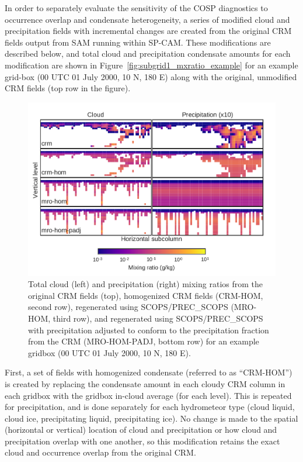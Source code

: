 In order to separately evaluate the sensitivity of the COSP diagnostics
to occurrence overlap and condensate heterogeneity, a series of modified
cloud and precipitation fields with incremental changes are created from
the original CRM fields output from SAM running within SP-CAM. These
modifications are described below, and total cloud and precipitation
condensate amounts for each modification are shown in
Figure~\ref{fig:subgrid1_mxratio_example} for an example grid-box (00
UTC 01 July 2000, 10 N, 180 E) along with the original, unmodified CRM
fields (top row in the figure).

\begin{figure}[htbp]
\centering
\includegraphics{graphics/subgrid1_mxratio_example.pdf}
\caption{\label{fig:subgrid1_mxratio_example}Total cloud (left) and
precipitation (right) mixing ratios from the original CRM fields (top),
homogenized CRM fields (CRM-HOM, second row), regenerated using
SCOPS/PREC\_SCOPS (MRO-HOM, third row), and regenerated using
SCOPS/PREC\_SCOPS with precipitation adjusted to conform to the
precipitation fraction from the CRM (MRO-HOM-PADJ, bottom row) for an
example gridbox (00 UTC 01 July 2000, 10 N, 180
E).}\label{fig:subgrid1ux5fmxratioux5fexample}
\end{figure}

First, a set of fields with homogenized condensate (referred to as
``CRM-HOM'') is created by replacing the condensate amount in each
cloudy CRM column in each gridbox with the gridbox in-cloud average (for
each level). This is repeated for precipitation, and is done separately
for each hydrometeor type (cloud liquid, cloud ice, precipitating
liquid, precipitating ice). No change is made to the spatial (horizontal
or vertical) location of cloud and precipitation or how cloud and
precipitation overlap with one another, so this modification retains the
exact cloud and occurrence overlap from the original CRM.

